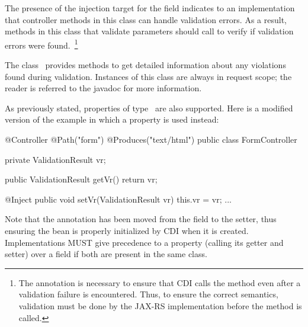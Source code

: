 The presence of the injection target for the field 
 indicates to an implementation that controller methods in this
class can handle validation errors. As a result, methods in this class
that validate parameters should call  to verify if
validation errors were found.~\footnote{The  
annotation is necessary to ensure that CDI calls the method even after 
a validation failure is encountered. Thus, to ensure the correct semantics, 
validation  must be done by the JAX-RS implementation before the method 
is called.}

The class \ValRes\ provides methods to get detailed information about any violations 
found during validation. Instances of this class are always in request
scope; the reader is referred to the javadoc for more information.

As previously stated, properties of type \ValRes\
are also supported. Here is a modified version of the example in which
a property is used instead:

\begin{listing}{1}
@Controller
@Path("form")
@Produces("text/html")
public class FormController {

    private ValidationResult vr;
    
    public ValidationResult getVr() {
        return vr;
    }

    @Inject
    public void setVr(ValidationResult vr) {
        this.vr = vr;
    }
    ...
}
\end{listing}

Note that the  annotation has been moved from the field to the setter,
thus ensuring the bean is properly initialized by CDI when it is
created. Implementations MUST give precedence to a property (calling its getter and
setter) over a field if both are present in the same class.
 

